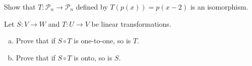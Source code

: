 \documentclass[11pt,letterpaper,boxed]{pset}
\begin{document}
    \begin{problem} [6.5 \#28]
    Show that $T:\mathscr{P}_n \xrightarrow{} \mathscr{P}_n$ defined by $T(p(x)) = p(x-2)$ is an isomorphism.
    \end{problem}
    \newpage
    
    \begin{problem} [6.5 \#34]
    Let $S: V \xrightarrow{} W$ and $T: U \xrightarrow{} V$ be linear transformations.
    
    \begin{enumerate} [(a)]
        \item Prove that if $S \circ T$ is one-to-one, so is $T$.
        \item Prove that if $S \circ T$ is onto, so is $S$.
    \end{enumerate}
    \end{problem}
    \newpage
\end{document}

